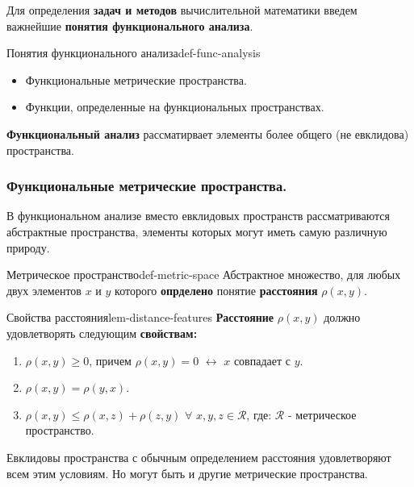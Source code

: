 \documentclass[14pt]{extarticle}
\begin{document}
        Для определения \textbf{задач и методов} вычислительной математики введем важнейшие \textbf{понятия функционального анализа}.

        \begin{definition}{Понятия функционального анализа}{def-func-analysis}
            \begin{itemize}
                \item Функциональные метрические пространства.
                \item Функции, определенные на функциональных пространствах.
            \end{itemize}
        \end{definition}

        \textbf{Функциональный анализ} рассматирвает элементы более общего (не евклидова) пространства.

    \subsubsection{Функциональные метрические пространства.}
        
        В функциональном анализе вместо евклидовых пространств рассматриваются абстрактные пространства, элементы которых могут иметь самую различную природу.

        \begin{definition}{Метрическое пространство}{def-metric-space}
            Абстрактное множество, для любых двух элементов $x$ и $y$ которого \textbf{опрделено} понятие \textbf{расстояния} $\rho(x, y)$.
        \end{definition}

        \begin{lemma}{Свойства расстояния}{lem-distance-features}
            \textbf{Расстояние} $\rho(x, y)$ должно удовлетворять следующим \textbf{свойствам:}
            \begin{enumerate}
                \item $\rho(x,y) \geq 0$, причем $\rho(x, y) = 0$ $\leftrightarrow$ $x$ совпадает с $y$.
                \item $\rho(x, y) = \rho(y, x)$.
                \item $\rho(x, y) \leq \rho(x, z) + \rho(z, y)$ $\forall$ $x, y, z \in \mathscr{R}$, где: $\mathscr{R}$ - метрическое пространство.
            \end{enumerate}
        \end{lemma}

        Евклидовы пространства с обычным определением расстояния удовлетворяют всем этим условиям. Но могут быть и другие метрические пространства.
\end{document}
